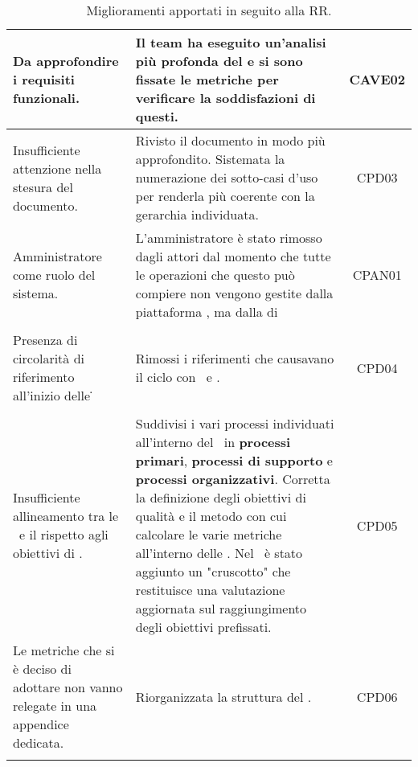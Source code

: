 \begin{longtable}{|C{4cm}|C{9cm}|c|}
		Da approfondire i requisiti funzionali. & Il team ha eseguito un'analisi più profonda del  e si sono fissate le metriche per verificare la soddisfazioni di questi. & CAVE02\\ \hline %
		Insufficiente attenzione nella stesura del documento. & Rivisto il documento in modo più approfondito. Sistemata la numerazione dei sotto-casi d'uso per renderla più coerente con la gerarchia individuata. & CPD03\\ \hline %
		Amministratore come ruolo del sistema. & L'amministratore è stato rimosso dagli attori dal momento che tutte le operazioni che questo può compiere non vengono gestite dalla piattaforma \NomeProgetto, ma dalla  di  & CPAN01\\ \hline %
		\\ \hline
		Presenza di circolarità di riferimento all'inizio delle \NdP\. & Rimossi i riferimenti che causavano il ciclo con \PdP\ e  \PdQ{}. & CPD04\\ \hline %
		\\ \hline
		Insufficiente allineamento tra le \NdP\ e il \PdQ{} rispetto agli obiettivi di . & Suddivisi i vari processi individuati all'interno del \PdQ\ in \textbf{processi primari}, \textbf{processi di supporto} e \textbf{processi organizzativi}. Corretta la definizione degli obiettivi di qualità e il metodo con cui calcolare le varie metriche all'interno delle \NdP{}. Nel \PdQ\ è stato aggiunto un "cruscotto" che restituisce una valutazione aggiornata sul raggiungimento degli obiettivi prefissati. & CPD05\\ \hline %
		Le metriche che si è deciso di adottare non vanno relegate in una appendice dedicata. & Riorganizzata la struttura del \PdQ{}. & CPD06\\ \hline %
		\caption{Miglioramenti apportati in seguito alla RR.}\\
	\end{longtable}
